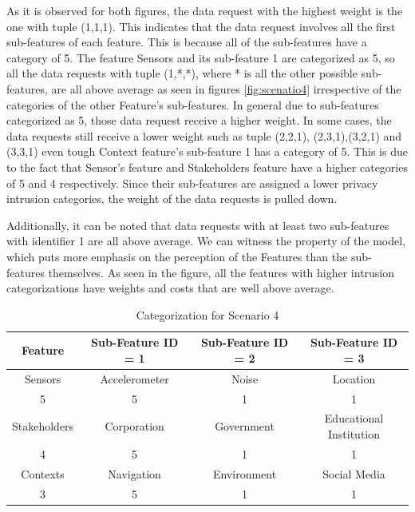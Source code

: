 As it is observed for both figures, the data request with the highest weight is the one with tuple (1,1,1). This indicates that the data request involves all the first sub-features of each feature. This is because all of the sub-features have a category of 5. The feature Sensors and its sub-feature 1 are categorized as 5, so all the data requests
with tuple (1,*,*), where * is all the other possible sub-features, are all above average as seen in figures \ref{fig:scenatio4} irrespective of
the categories of the other Feature's sub-features. In general due to sub-features categorized as 5, those data request receive a higher weight. In some cases, the data requests still receive a lower weight such as tuple (2,2,1),
(2,3,1),(3,2,1) and (3,3,1) even tough Context feature's sub-feature 1 has a category of 5. This is due to the fact that Sensor's feature and Stakeholders feature have a higher categories of 5 and 4 respectively. Since their sub-features are assigned a lower privacy intrusion categories, the weight of the data requests is pulled
down. 

Additionally, it can be noted that data requests with at least two sub-features with identifier 1 are all above average. We can witness the property of the model, which puts more emphasis on the perception of the Features than the sub-features themselves. As seen in the figure, all the features with higher intrusion categorizations have weights and costs that are well above average.

\begin{table}[h!]
  \centering
  \caption{Categorization for Scenario 4}
  \label{tab:scenario4}
  \begin{tabular}{cccc}
    \toprule
    Feature & Sub-Feature ID = 1 & Sub-Feature ID = 2 & Sub-Feature ID = 3\\
    \midrule
    Sensors & Accelerometer & Noise & Location\\
     5 & 5 & 1 & 1\\ \hhline{====}
     Stakeholders & Corporation & Government & Educational Institution\\
     4 & 5 & 1 & 1\\ \hhline{====}
     Contexts & Navigation & Environment & Social Media\\
     3 & 5 & 1 & 1\\ 
    \bottomrule
  \end{tabular}
\end{table}

